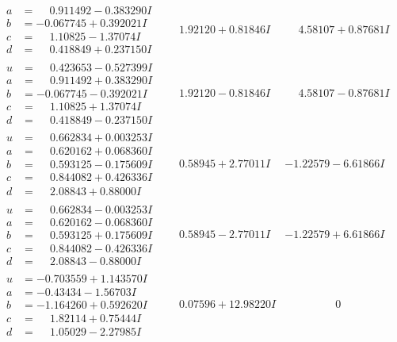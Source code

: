 \documentclass[1p]{elsarticle_modified}
\theoremstyle{definition}
\begin{document}
$$\begin{array}{c|c|c}
\begin{aligned}
a &= \phantom{-}0.911492 - 0.383290 I \\
b &= -0.067745 + 0.392021 I \\
c &= \phantom{-}1.10825 - 1.37074 I \\
d &= \phantom{-}0.418849 + 0.237150 I\end{aligned}
 & \phantom{-}1.92120 + 0.81846 I & \phantom{-}4.58107 + 0.87681 I \\ \hline\begin{aligned}
u &= \phantom{-}0.423653 - 0.527399 I \\
a &= \phantom{-}0.911492 + 0.383290 I \\
b &= -0.067745 - 0.392021 I \\
c &= \phantom{-}1.10825 + 1.37074 I \\
d &= \phantom{-}0.418849 - 0.237150 I\end{aligned}
 & \phantom{-}1.92120 - 0.81846 I & \phantom{-}4.58107 - 0.87681 I \\ \hline\begin{aligned}
u &= \phantom{-}0.662834 + 0.003253 I \\
a &= \phantom{-}0.620162 + 0.068360 I \\
b &= \phantom{-}0.593125 - 0.175609 I \\
c &= \phantom{-}0.844082 + 0.426336 I \\
d &= \phantom{-}2.08843 + 0.88000 I\end{aligned}
 & \phantom{-}0.58945 + 2.77011 I & -1.22579 - 6.61866 I \\ \hline\begin{aligned}
u &= \phantom{-}0.662834 - 0.003253 I \\
a &= \phantom{-}0.620162 - 0.068360 I \\
b &= \phantom{-}0.593125 + 0.175609 I \\
c &= \phantom{-}0.844082 - 0.426336 I \\
d &= \phantom{-}2.08843 - 0.88000 I\end{aligned}
 & \phantom{-}0.58945 - 2.77011 I & -1.22579 + 6.61866 I \\ \hline\begin{aligned}
u &= -0.703559 + 1.143570 I \\
a &= -0.43434 - 1.56703 I \\
b &= -1.164260 + 0.592620 I \\
c &= \phantom{-}1.82114 + 0.75444 I \\
d &= \phantom{-}1.05029 - 2.27985 I\end{aligned}
 & \phantom{-}0.07596 + 12.98220 I & \phantom{-0.000000 } 0 \\ \hline\begin{aligned}

\end{aligned}
\end{array}$$
\end{document}
